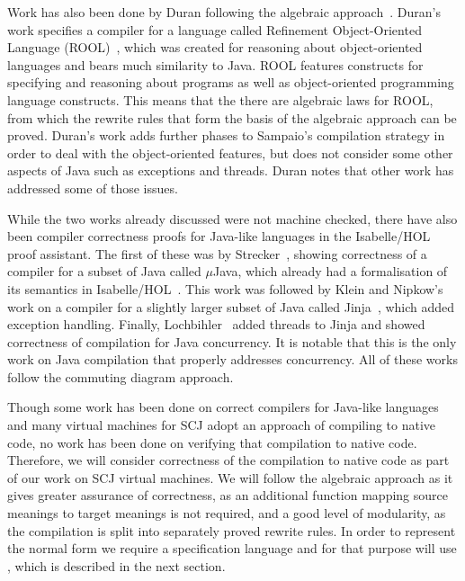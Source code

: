 \documentclass[a4paper,10pt]{report}
\begin{document}
Work has also been done by Duran following the algebraic
approach~\cite{duran2005, duran2010}.  Duran's work specifies a compiler for a
language called Refinement Object-Oriented Language (ROOL)~\cite{borba2000},
which was created for reasoning about object-oriented languages and bears much
similarity to Java.  ROOL features constructs for specifying and reasoning about
programs as well as object-oriented programming language constructs.  This means
that the there are algebraic laws for ROOL, from which the rewrite rules that
form the basis of the algebraic approach can be proved.  Duran's work adds
further phases to Sampaio's compilation strategy in order to deal with the
object-oriented features, but does not consider some other aspects of Java such
as exceptions and threads.  Duran notes that other work has addressed some of
those issues.

While the two works already discussed were not machine checked, there have also
been compiler correctness proofs for Java-like languages in the Isabelle/HOL
proof assistant.  The first of these was by Strecker~\cite{strecker2002},
showing correctness of a compiler for a subset of Java called $\mu$Java, which
already had a formalisation of its semantics in Isabelle/HOL~\cite{nipkow2000}.
This work was followed by Klein and Nipkow's work on a compiler for a slightly
larger subset of Java called Jinja~\cite{klein2006}, which added exception
handling.  Finally, Lochbihler~\cite{lochbihler2010} added threads to Jinja and
showed correctness of compilation for Java concurrency.  It is notable that this
is the only work on Java compilation that properly addresses concurrency.  All
of these works follow the commuting diagram approach.

Though some work has been done on correct compilers for Java-like languages and
many virtual machines for SCJ adopt an approach of compiling to native code, no
work has been done on verifying that compilation to native code.  Therefore, we
will consider correctness of the compilation to native code as part of our work
on SCJ virtual machines.  We will follow the algebraic approach as it gives
greater assurance of correctness, as an additional function mapping source
meanings to target meanings is not required, and a good level of modularity, as
the compilation is split into separately proved rewrite rules.  In order to
represent the normal form we require a specification language and for that
purpose will use \Circus{}, which is described in the next section.

\section{\Circus{}}
\label{circus-section}
\end{document}
